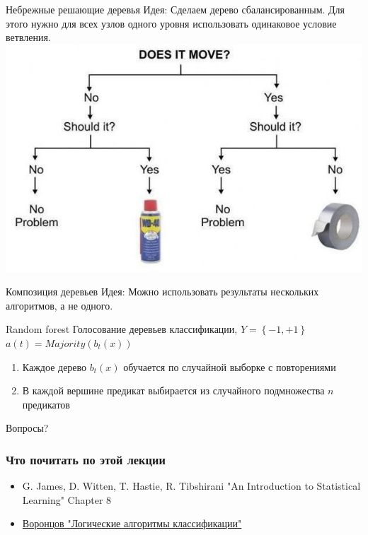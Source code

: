 \documentclass[10pt]{beamer}
\begin{document}
{
\begin{frame}{Небрежные решающие деревья}
  \alert{Идея}: Сделаем дерево сбалансированным. Для этого нужно для всех узлов одного уровня использовать одинаковое условие ветвления.
  \pause
  \bigbreak
  \includegraphics[width = \textwidth, keepaspectratio = true]{images/decisiontree}
\end{frame}
}

\begin{frame}{Композиция деревьев}
  \alert{Идея}: Можно использовать результаты нескольких	алгоритмов, а не одного.
\end{frame}

\begin{frame}{Random forest}
	Голосование деревьев классификации, $Y = \left\{ -1, +1 \right\}$\\
	$a(t) = Majority(b_t(x))$%
	\begin{enumerate}[--]
  	  \item Каждое дерево $b_t(x)$ обучается по случайной выборке с повторениями
	  \item В каждой вершине предикат выбирается из случайного подмножества $n$ предикатов
	\end{enumerate}
\end{frame}

\begin{frame}[standout]
  Вопросы?
\end{frame}

\appendix

\begin{frame}\frametitle{Что почитать по этой лекции}
  \begin{itemize}
    \item G. James, D. Witten, T. Hastie, R. Tibshirani "An Introduction to Statistical Learning" Chapter 8
    \item \href{http://www.machinelearning.ru/wiki/images/3/3e/Voron-ML-Logic.pdf}{Воронцов "Логические алгоритмы классификации"}
  \end{itemize}
\end{frame}
\end{document}
